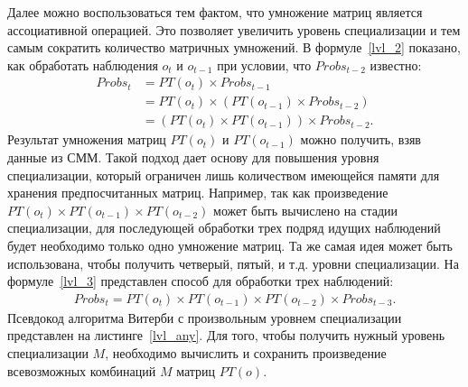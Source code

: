 Далее можно воспользоваться тем фактом, что умножение матриц 
является ассоциативной операцией.
Это позволяет увеличить уровень специализации и тем самым 
сократить количество матричных умножений.
В формуле~\ref{lvl_2} показано, как обработать наблюдения $o_{t}$ и $o_{t-1}$ при условии, 
что $Probs_{t-2}$ известно:
\begin{align}
  \mathit{Probs}_{t} &= \mathit{PT}(\mathit{o}_{t}) \times \mathit{Probs}_{t-1}\nonumber\\
  &= \mathit{PT}(\mathit{o}_{t}) \times (\mathit{PT}(\mathit{o}_{t-1}) \times \mathit{Probs}_{t-2}) \nonumber\\
  & =(\mathit{PT}(\mathit{o}_{t}) \times \mathit{PT}(\mathit{o}_{t-1})) \times \mathit{Probs}_{t-2}.
\label{lvl_2}
\end{align}
Результат умножения матриц $PT(o_t)$ и $PT(o_{t-1})$
можно получить, взяв данные из СММ.
Такой подход дает основу для повышения уровня специализации, 
который ограничен лишь количеством имеющейся памяти для хранения предпосчитанных матриц.
Например, так как произведение $\mathit{PT}(o_t) \times \mathit{PT}(o_{t-1}) \times \mathit{PT}(o_{t-2})$
может быть вычислено на стадии специализации, для последующей обработки трех подряд идущих наблюдений будет необходимо 
только одно умножение матриц.
Та же самая идея может быть использована, чтобы получить 
четверый, пятый, и т.д. уровни специализации.
На формуле~\ref{lvl_3} представлен способ для обработки трех 
наблюдений:
\begin{align}
  \mathit{Probs}_{t} = \mathit{PT}(o_t) \times \mathit{PT}(o_{t-1}) \times \mathit{PT}(o_{t-2}) \times \mathit{Probs}_{t - 3}.
\label{lvl_3}
\end{align}
Псевдокод алгоритма Витерби с произвольным уровнем 
специализации представлен на листинге~\ref{lvl_any}.
Для того, чтобы получить нужный уровень специализации $M$, 
необходимо вычислить и сохранить произведение всевозможных 
комбинаций $M$ матриц $PT(o)$.
